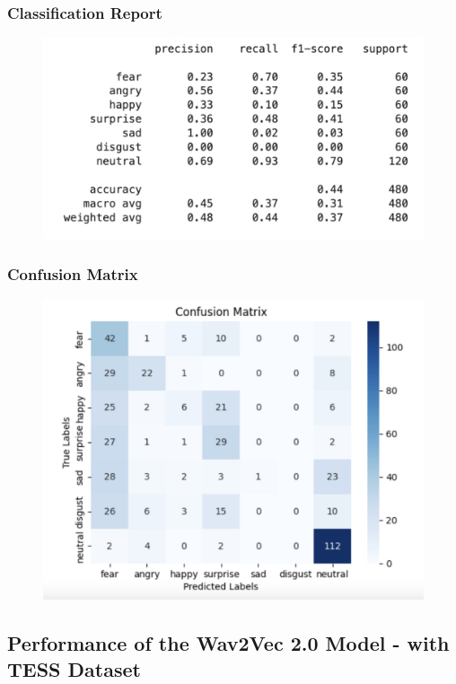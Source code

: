 \documentclass[a4paper,12pt]{article}
\begin{document}
\subsubsection{Classification Report}
\begin{figure}[H]
    \centering
    \includegraphics[width=1\linewidth]{545.png}
\end{figure}
\subsubsection{Confusion Matrix}
\begin{figure}[H]
    \centering
    \includegraphics[width=1\linewidth]{525.png}
\end{figure}
\newpage
\subsection{Performance of the Wav2Vec 2.0 Model - with TESS Dataset}
\end{document}

